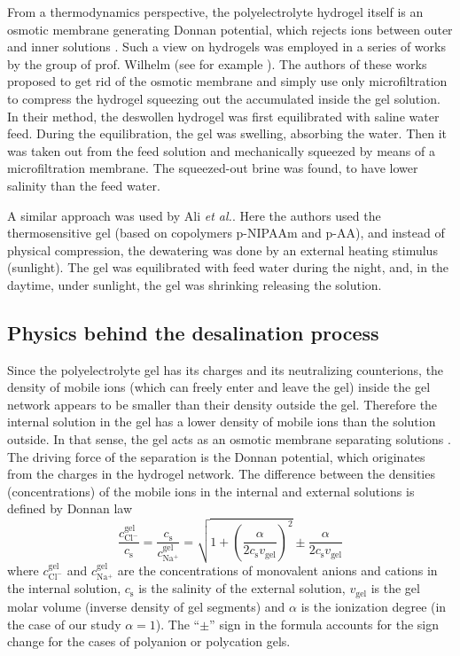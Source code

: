 \documentclass[journal,article,submit,pdftex,moreauthors]{Definitions/mdpi}
\newcommand{\cna}{c_\mathrm{Na^+}}
\newcommand{\ccl}{c_\mathrm{Cl^-}}
\newcommand{\gel}{^\mathrm{gel}}
\newcommand{\cs}{c_{\mathrm{s}}}
\newcommand{\vgel}{v_\mathrm{gel}}
\newcommand{\etal}{\textit{et al.}{}}
\begin{document}
From a thermodynamics perspective, the polyelectrolyte hydrogel itself is an osmotic membrane generating Donnan potential, which rejects ions between outer and inner solutions \cite{Wang_2014}.
Such a view on hydrogels was employed in a series of works by the group of prof. Wilhelm (see for example \cite{Arens_2017,Fengler_2020}).
The authors of these works proposed to get rid of the osmotic membrane and simply use only microfiltration to compress the hydrogel squeezing out the accumulated inside the gel solution.
In their method, the deswollen hydrogel was first equilibrated with saline water feed.
During the equilibration, the gel was swelling, absorbing the water.
Then it was taken out from the feed solution and mechanically squeezed by means of a microfiltration membrane.
The squeezed-out brine was found, to have lower salinity than the feed water.

A similar approach was used by Ali \etal \cite{Ali2015}.
Here the authors used the thermosensitive gel (based on copolymers p-NIPAAm and p-AA), and instead of physical compression, the dewatering was done by an external heating stimulus (sunlight).
The gel was equilibrated with feed water during the night, and, in the daytime, under sunlight, the gel was shrinking releasing the solution.

\subsection{Physics behind the desalination process}
Since the polyelectrolyte gel has its charges and its neutralizing counterions, the density of mobile ions (which can freely enter and leave the gel) inside the gel network appears to be smaller than their density outside the gel.
Therefore the internal solution in the gel has a lower density of mobile ions than the solution outside.
In that sense, the gel acts as an osmotic membrane separating solutions \cite{Rud2020}.
The driving force of the separation is the Donnan potential, which originates from the charges in the hydrogel network.
The difference between the densities (concentrations) of the mobile ions in the internal and external solutions
is defined by Donnan law \cite{Rud2018}
\begin{equation}
\frac{\ccl\gel}{\cs}=\frac{\cs}{\cna\gel}=\sqrt{1+\left(\frac{\alpha}{2\cs\vgel}\right)^{2}}\pm\frac{\alpha}{2\cs\vgel}
\end{equation}
where $\ccl\gel$ and $\cna\gel$ are the concentrations of monovalent anions and cations in the internal solution,
$\cs$ is the salinity of the external solution, $\vgel$ is the gel molar volume (inverse density of gel segments)
and $\alpha$ is the ionization degree (in the case of our study $\alpha=1$).
The ``$\pm$'' sign in the formula accounts for the sign change for the cases of polyanion or polycation gels.
\end{document}
